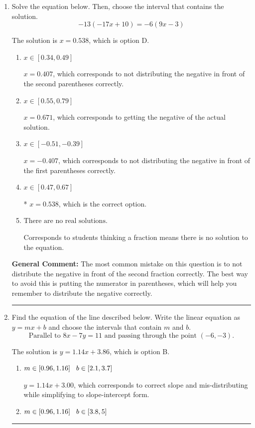 \documentclass{extbook}[14pt]
\newcommand{\litem}[1]{\item #1

\rule{\textwidth}{0.4pt}}
\begin{document}
\begin{enumerate}\litem{
Solve the equation below. Then, choose the interval that contains the solution.
\[ -13(-17x + 10) = -6(9x -3) \]

The solution is \( x = 0.538 \), which is option D.\begin{enumerate}[label=\Alph*.]
\item \( x \in [0.34, 0.49] \)

$x = 0.407$, which corresponds to not distributing the negative in front of the second parentheses correctly.
\item \( x \in [0.55, 0.79] \)

$x = 0.671$, which corresponds to getting the negative of the actual solution.
\item \( x \in [-0.51, -0.39] \)

$x = -0.407$, which corresponds to not distributing the negative in front of the first parentheses correctly.
\item \( x \in [0.47, 0.67] \)

* $x = 0.538$, which is the correct option.
\item \( \text{There are no real solutions.} \)

Corresponds to students thinking a fraction means there is no solution to the equation.
\end{enumerate}

\textbf{General Comment:} The most common mistake on this question is to not distribute the negative in front of the second fraction correctly. The best way to avoid this is putting the numerator in parentheses, which will help you remember to distribute the negative correctly.
}
\litem{
Find the equation of the line described below. Write the linear equation as $ y=mx+b $ and choose the intervals that contain $m$ and $b$.
\[ \text{Parallel to } 8 x - 7 y = 11 \text{ and passing through the point } (-6, -3). \]

The solution is \( y = 1.14x + 3.86 \), which is option B.\begin{enumerate}[label=\Alph*.]
\item \( m \in [0.96, 1.16] \hspace*{3mm} b \in [2.1, 3.7] \)

 $y = 1.14x + 3.00$, which corresponds to correct slope and mis-distributing while simplifying to slope-intercept form.
\item \( m \in [0.96, 1.16] \hspace*{3mm} b \in [3.8, 5] \)


\end{enumerate}}
\end{enumerate}
\end{document}
